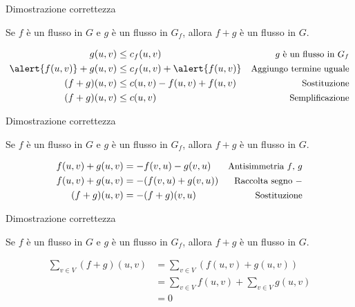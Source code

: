\begin{frame}{Dimostrazione correttezza}

\vspace{-9pt}
\begin{myboxtitle}[Lemma]
Se $f$ è un flusso in $G$ e $g$ è un flusso in $G_f$, allora
$f+g$ è un flusso in $G$.
\end{myboxtitle}

\begin{align*}
g(u,v) &\leq c_f(u,v) & \textrm{\small $g$ è un flusso in $G_f$} \\
\alert{f(u,v)} + g(u,v) &\leq  c_f(u,v) + \alert{f(u,v)} & \textrm{\small Aggiungo termine uguale}\\
(f+g)(u,v) &\leq c(u,v)-f(u,v) + f(u,v) & \textrm{\small Sostituzione}\\
(f+g)(u,v) &\leq c(u,v) & \textrm{\small Semplificazione}
\end{align*}

\end{frame}

\begin{frame}{Dimostrazione correttezza}

\vspace{-9pt}
\begin{myboxtitle}[Lemma]
Se $f$ è un flusso in $G$ e $g$ è un flusso in $G_f$, allora
$f+g$ è un flusso in $G$.
\end{myboxtitle}

\begin{align*}
f(u,v)+g(u,v) &= -f(v,u)-g(v,u) & \textrm{\small Antisimmetria $f$, $g$} \\
f(u,v)+g(u,v) &= -(f(v,u) + g(v,u)) & \textrm{\small Raccolta segno $-$} \\
(f+g)(u,v) &= -(f+g)(v,u) & \textrm{\small Sostituzione} 
\end{align*}

\end{frame}

\begin{frame}{Dimostrazione correttezza}

\vspace{-9pt}
\begin{myboxtitle}[Lemma]
Se $f$ è un flusso in $G$ e $g$ è un flusso in $G_f$, allora
$f+g$ è un flusso in $G$.
\end{myboxtitle}


\begin{align*}
  \sum_{v \in V} (f+g)(u,v) &= \sum_{v \in V} (f(u,v) + g(u,v)) \\
  &= \sum_{v \in V} f(u,v) + \sum_{v \in V} g(u,v) \\
   &= 0
\end{align*}

\end{frame}


